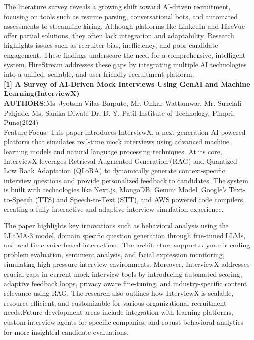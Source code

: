 \documentclass[a4paper, 12pt]{report}
\begin{document}
The literature survey reveals a growing shift toward AI-driven recruitment, focusing on tools such as resume parsing, conversational bots, and automated assessments to streamline hiring. Although platforms like LinkedIn and HireVue offer partial solutions, they often lack integration and adaptability. Research highlights issues such as recruiter bias, inefficiency, and poor candidate engagement. These findings underscore the need for a comprehensive, intelligent system. HireStream addresses these gaps by integrating multiple AI technologies into a unified, scalable, and user-friendly recruitment platform.\\
\noindent \textbf{[1] A Survey of AI-Driven Mock Interviews Using GenAI and Machine Learning(InterviewX)}\\
\textbf{AUTHORS:}Ms. Jyotsna Vilas Barpute, Mr. Onkar Wattamwar, Mr. Suhelali Pakjade, Ms. Sanika Diwate Dr. D. Y. Patil Institute of Technology, Pimpri, Pune(2024)\\
Feature Focus: This paper introduces InterviewX, a next-generation AI-powered platform that simulates real-time mock interviews using advanced machine learning models and natural language processing techniques. At its core, InterviewX leverages Retrieval-Augmented Generation (RAG) and Quantized Low Rank Adaptation (QLoRA) to dynamically generate context-specific interview questions and provide personalized feedback to candidates. The system is built with technologies like Next.js, MongoDB, Gemini Model, Google’s Text-to-Speech (TTS) and Speech-to-Text (STT), and AWS powered code compilers, creating a fully interactive and adaptive interview simulation experience.

The paper highlights key innovations such as behavioral analysis using the LLaMA-3 model, domain specific question generation through fine-tuned LLMs, and real-time voice-based interactions. The architecture supports dynamic coding problem evaluation, sentiment analysis, and facial expression monitoring, simulating high-pressure interview environments. Moreover, InterviewX addresses crucial gaps in current mock interview tools by introducing automated scoring, adaptive feedback loops, privacy aware fine-tuning, and industry-specific content relevance using RAG.
The research also outlines how InterviewX is scalable, resource-efficient, and customizable for various organizational recruitment needs.Future development areas include integration with learning platforms, custom interview agents for specific companies, and robust behavioral analytics for more insightful candidate evaluations.
\\
\end{document}
